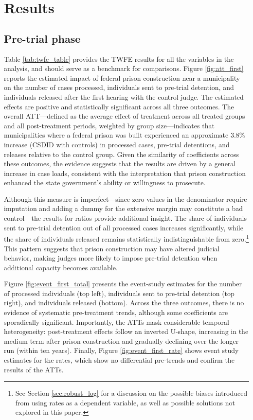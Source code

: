 \section{Results}
\label{sec:results}

 
\subsection*{Pre-trial phase}

Table \ref{tab:twfe_table} provides the TWFE results for all the variables in the analysis, and should serve as a benchmark for comparisons. Figure \ref{fig:att_first} reports the estimated impact of federal prison construction near a municipality on the number of cases processed, individuals sent to pre-trial detention, and individuals released after the first hearing with the control judge. The estimated effects are positive and statistically significant across all three outcomes. The overall ATT—defined as the average effect of treatment across all treated groups and all post-treatment periods, weighted by group size—indicates that municipalities where a federal prison was built experienced an approximate 3.8\% increase (CSDID with controls) in processed cases, pre-trial detentions, and releases relative to the control group. Given the similarity of coefficients across these outcomes, the evidence suggests that the results are driven by a general increase in case loads, consistent with the interpretation that prison construction enhanced the state government’s ability or willingness to prosecute.

Although this measure is imperfect—since zero values in the denominator require imputation and adding a dummy for the extensive margin may constitute a bad control—the results for ratios provide additional insight. The share of individuals sent to pre-trial detention out of all processed cases increases significantly, while the share of individuals released remains statistically indistinguishable from zero.\footnote{See Section \ref{sec:robust_log} for a discussion on the possible biases introduced from using rates as a dependent variable, as well as possible solutions not explored in this paper.} This pattern suggests that prison construction may have altered judicial behavior, making judges more likely to impose pre-trial detention when additional capacity becomes available.

Figure \ref{fig:event_first_total} presents the event-study estimates for the number of processed individuals (top left), individuals sent to pre-trial detention (top right), and individuals released (bottom). Across the three outcomes, there is no evidence of systematic pre-treatment trends, although some coefficients are sporadically significant. Importantly, the ATTs mask considerable temporal heterogeneity: post-treatment effects follow an inverted U-shape, increasing in the medium term after prison construction and gradually declining over the longer run (within ten years). Finally, Figure \ref{fig:event_first_rate} shows event study estimates for the rates, which show no differential pre-trends and confirm the results of the ATTs.

